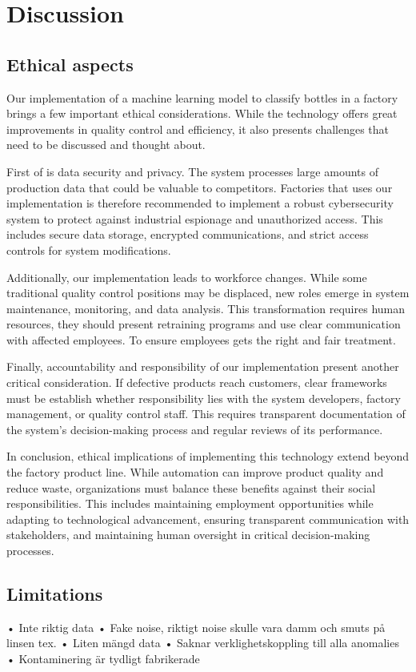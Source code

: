 \section{Discussion}

\subsection{Ethical aspects}

Our implementation of a machine learning model to classify bottles in a factory brings a few important ethical considerations. 
While the technology offers great improvements in quality control and efficiency, it also presents challenges that need to be discussed and thought about.

First of is data security and privacy. 
The system processes large amounts of production data that could be valuable to competitors. 
Factories that uses our implementation is therefore recommended to implement a robust cybersecurity system to protect against industrial espionage and unauthorized access. 
This includes secure data storage, encrypted communications, and strict access controls for system modifications.

Additionally, our implementation leads to workforce changes. While some traditional quality control positions may be displaced, new roles emerge in system maintenance, monitoring, and data analysis. 
This transformation requires human resources, they should present retraining programs and use clear communication with affected employees.
To ensure employees gets the right and fair treatment.

Finally, accountability and responsibility of our implementation present another critical consideration. 
If defective products reach customers, clear frameworks must be establish whether responsibility lies with the system developers, factory management, or quality control staff. 
This requires transparent documentation of the system's decision-making process and regular reviews of its performance.

In conclusion, ethical implications of implementing this technology extend beyond the factory product line.
While automation can improve product quality and reduce waste, organizations must balance these benefits against their social responsibilities. 
This includes maintaining employment opportunities while adapting to technological advancement, ensuring transparent communication with stakeholders, and maintaining human oversight in critical decision-making processes.

\subsection{Limitations}

• Inte riktig data
• Fake noise, riktigt noise skulle vara damm och smuts på linsen tex.
• Liten mängd data
• Saknar verklighetskoppling till alla anomalies
• Kontaminering är tydligt fabrikerade